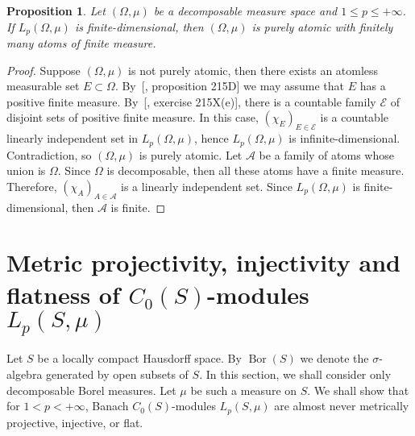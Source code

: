 \documentclass[12pt]{article}
\newtheorem{proposition}[theorem]{Proposition}
\begin{document}
\begin{proposition}\label{LpFinDimCharac}
    Let $(\Omega,\mu)$ be a decomposable measure space 
    and $1\leq p\leq+\infty$. If $L_p(\Omega,\mu)$ is finite-dimensional, 
    then $(\Omega,\mu)$ is purely atomic with finitely many atoms of finite 
    measure.
\end{proposition} 
\begin{proof}
    Suppose $(\Omega,\mu)$ is not purely atomic, then there exists an atomless 
    measurable set $E\subset \Omega$. By~[\cite{FremMeasTh2}, proposition 215D] 
    we may assume that $E$ has a positive finite measure. 
    By~[\cite{FremMeasTh2}, exercise 215X(e)], there is a countable 
    family $\mathcal{E}$ of disjoint sets of positive finite measure. In this 
    case, $(\chi_{E})_{E\in\mathcal{E}}$ is a countable linearly independent 
    set in $L_p(\Omega,\mu)$, hence $L_p(\Omega,\mu)$ is infinite-dimensional. 
    Contradiction, so $(\Omega,\mu)$ is purely atomic. Let $\mathcal{A}$ be a 
    family of atoms whose union is $\Omega$. Since $\Omega$ is decomposable, 
    then all these atoms have a finite measure. 
    Therefore, $(\chi_{A})_{A\in\mathcal{A}}$ is a linearly independent set. 
    Since $L_p(\Omega,\mu)$ is finite-dimensional, then $\mathcal{A}$ is finite.
\end{proof}


\section{Metric projectivity, injectivity and flatness of 
\texorpdfstring{$C_0(S)$}{C0(S)}-modules 
\texorpdfstring{$L_p(S,\mu)$}{LpSmu}}
\label{MetrProInjFltOfC0SModLp}

Let $S$ be a locally compact Hausdorff space. By $\operatorname{Bor}(S)$ we 
denote the $\sigma$-algebra generated by open subsets of $S$. In this section, 
we shall consider only decomposable Borel measures. Let $\mu$ be such a measure 
on $S$. We shall show that for $1<p<+\infty$, Banach $C_0(S)$-modules 
$L_p(S,\mu)$ are almost never metrically projective, injective, or flat. 
\end{document}
